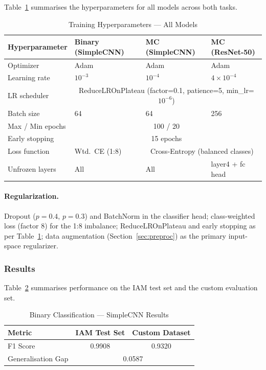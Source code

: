 \documentclass[12pt, a4paper]{article}
\begin{document}
Table~\ref{tab:hparams} summarises the hyperparameters for all models across both tasks.

\begin{table}[H]
\centering
\caption{Training Hyperparameters --- All Models}
\label{tab:hparams}
\begin{tabular}{llll}
\toprule
\textbf{Hyperparameter} & \textbf{Binary (SimpleCNN)} & \textbf{MC (SimpleCNN)} & \textbf{MC (ResNet-50)} \\ \midrule
Optimizer               & Adam          & Adam         & Adam \\
Learning rate           & $10^{-3}$     & $10^{-4}$    & $4\times10^{-4}$ \\
LR scheduler            & \multicolumn{3}{c}{ReduceLROnPlateau (factor=0.1, patience=5, min\_lr=$10^{-6}$)} \\
Batch size              & 64            & 64           & 256 \\
Max / Min epochs        & \multicolumn{3}{c}{100 / 20} \\
Early stopping          & \multicolumn{3}{c}{15 epochs} \\
Loss function           & Wtd.\ CE (1:8) & \multicolumn{2}{c}{Cross-Entropy (balanced classes)} \\
Unfrozen layers         & All           & All          & layer4 + fc head \\ \bottomrule
\end{tabular}
\end{table}

\paragraph{Regularization.}
Dropout ($p{=}0.4$, $p{=}0.3$) and BatchNorm in the classifier head; class-weighted loss (factor 8) for the 1:8 imbalance; ReduceLROnPlateau and early stopping as per Table~\ref{tab:hparams}; data augmentation (Section~\ref{sec:preproc}) as the primary input-space regularizer.

\subsubsection{Results}

Table~\ref{tab:binary_results} summarises performance on the IAM test set and the custom evaluation set.

\begin{table}[H]
\centering
\caption{Binary Classification --- SimpleCNN Results}
\label{tab:binary_results}
\begin{tabular}{lcc}
\toprule
\textbf{Metric} & \textbf{IAM Test Set} & \textbf{Custom Dataset} \\ \midrule
F1 Score           & 0.9908 & 0.9320 \\
Generalisation Gap & \multicolumn{2}{c}{0.0587} \\ \bottomrule
\end{tabular}
\end{table}
\end{document}
